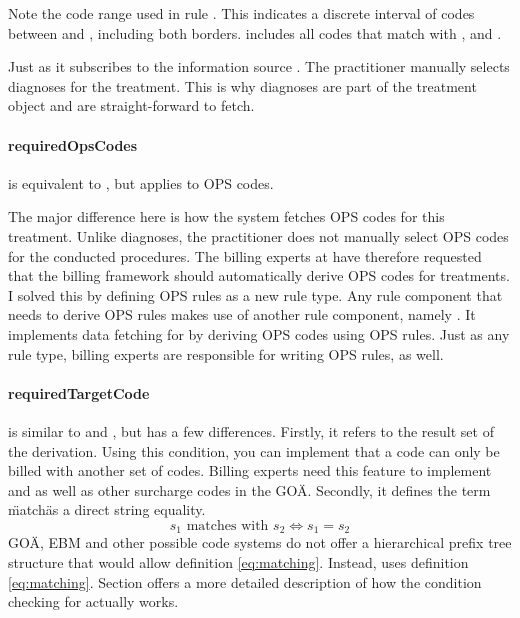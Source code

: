 Note the code range  used in rule .
This indicates a discrete interval of codes between  and , including both borders.
 includes all codes that match with ,  and .

Just as  it subscribes to the information source .
The practitioner manually selects diagnoses for the treatment.
This is why diagnoses are part of the treatment object and are straight-forward to fetch.

\paragraph{requiredOpsCodes}

 is equivalent to , but applies to OPS codes.

The major difference here is how the system fetches OPS codes for this treatment.
Unlike diagnoses, the practitioner does not manually select OPS codes for the conducted procedures.
The billing experts at \AV have therefore requested that the billing framework should automatically derive OPS codes for treatments.
I solved this by defining OPS rules as a new rule type.
Any rule component that needs to derive OPS rules makes use of another rule component, namely .
It implements data fetching for  by deriving OPS codes using OPS rules.
Just as any rule type, billing experts are responsible for writing OPS rules, as well.

\paragraph{requiredTargetCode}

 is similar to  and , but has a few differences.
Firstly, it refers to the result set of the derivation.
Using this condition, you can implement that a code can only be billed with another set of codes.
Billing experts need this feature to implement  and  as well as other surcharge codes in the GOÄ.
Secondly, it defines the term \"match\" as a direct string equality.
\begin{equation}\label{eq:matching-string-equals}
s_1 \text{ matches with } s_2 \iff s_1 = s_2
\end{equation}
GOÄ, EBM and other possible code systems do not offer a hierarchical prefix tree structure that would allow definition \ref{eq:matching}.
Instead,  uses definition \ref{eq:matching}.
Section \addref offers a more detailed description of how the condition checking for  actually works.

